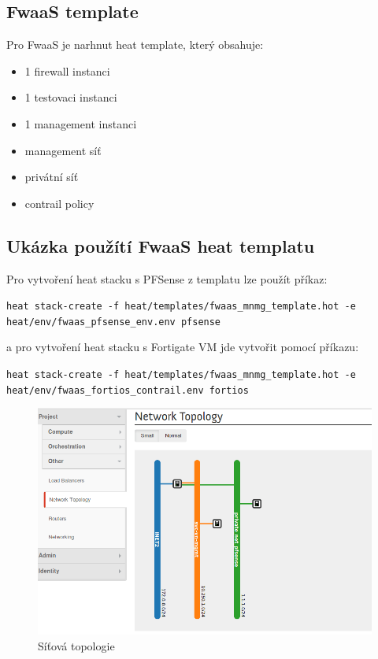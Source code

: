 \subsection{FwaaS template}

Pro FwaaS je narhnut heat template, který obsahuje:

\begin{itemize}
\item 1 firewall instanci
\item 1 testovaci instanci
\item 1 management instanci
\item management síť
\item privátní síť
\item contrail policy
\end{itemize}


\subsection{Ukázka použítí FwaaS heat templatu}\label{sub:interaction}

Pro vytvoření heat stacku s PFSense z templatu lze použít příkaz:

\verb!heat stack-create -f heat/templates/fwaas_mnmg_template.hot -e heat/env/fwaas_pfsense_env.env pfsense!

a pro vytvoření heat stacku s Fortigate VM jde vytvořit pomocí příkazu:

\verb!heat stack-create -f heat/templates/fwaas_mnmg_template.hot -e heat/env/fwaas_fortios_contrail.env fortios!


\begin{figure}[h]
\begin{centering}
\includegraphics[scale=0.45]{images/fwaas_topologie}
\par\end{centering}
\caption{Síťová topologie\label{fig:fwaas_topologie}}
\end{figure}


